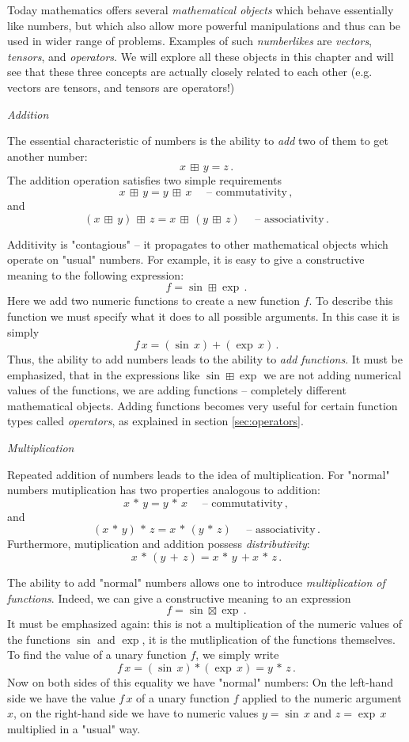 Today mathematics offers several \emph{mathematical objects} which behave essentially like numbers, but which also allow more powerful manipulations and thus can be used in wider range of problems. Examples of such \emph{numberlikes} are \emph{vectors}, \emph{tensors}, and \emph{operators}. We will explore all these objects in this chapter and will see that these three concepts are actually closely related to each other (e.g. vectors are tensors, and tensors are operators!)


\begin{flushleft}
	{\it Addition}
\end{flushleft}
The essential characteristic of numbers is the ability to \emph{add} two of them to get another number:
\[
x\,\boxplus\, y = z\,.
\]
The addition operation satisfies two simple requirements
\[
x\,\boxplus\, y = y\,\boxplus\, x\quad\textrm{ -- commutativity}\,,
\]
and
\[
(x\,\boxplus\, y)\,\boxplus\, z = x\,\boxplus\, (y\,\boxplus\, z) \quad\textrm{ -- associativity}\,.
\]


Additivity is "contagious" -- it propagates to other mathematical objects which operate on "usual" numbers. For example, it is easy to give a constructive meaning to the following expression:
\[
f = \sin\boxplus\exp\,.
\]
Here we add two numeric functions to create a new function $f$. To describe this function we must specify what it does to all possible arguments. In this case it is simply
\[
f\,x=(\sin\, x)+(\exp\, x)\,.
\]
Thus, the ability to add numbers leads to the ability to \emph{add functions}. It must be emphasized, that in the expressions like $\sin\boxplus\exp$ we are not adding numerical values of the functions, we are adding functions -- completely different mathematical objects. Adding functions becomes very useful for certain function types called \emph{operators}, as explained in section \ref{sec:operators}.

\begin{flushleft}
	{\it Multiplication}
\end{flushleft}
Repeated addition of numbers leads to the idea of multiplication. For "normal" numbers mutiplication has two properties analogous to addition:
\[
x\,*\, y = y\,*\, x\quad\textrm{ -- commutativity}\,,
\]
and
\[
(x\,*\, y)\,*\, z = x\,*\, (y\,*\, z) \quad\textrm{ -- associativity}\,.
\]
Furthermore, mutiplication and addition possess \emph{distributivity}:
\[
x\,*\, (y\,+\,z)=x\,*\, y\,+x\,*\, z\,.
\]

The ability to add "normal" numbers allows one to introduce \emph{multiplication of functions}. Indeed, we can give a constructive meaning to an expression 
\[
f = \sin\boxtimes\exp\,.
\]
It must be emphasized again: this is not a multiplication of the numeric values of the functions $\sin$ and $\exp$, it is the mutliplication of the functions themselves. 
To find the value of a unary function $f$, we simply write
\[
f\,x=(\sin\,x)*(\exp\,x)=y\,*\, z\,.
\]
Now on both sides of this equality we have "normal" numbers: On the left-hand side we have the value $f\,x$ of a unary function $f$ applied to the numeric argument $x$, on the right-hand side we have to numeric values $y=\sin\,x$ and $z=\exp\,x$ multiplied in a "usual" way.

